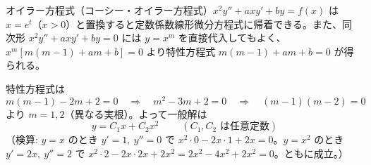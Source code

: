 
オイラー方程式（コーシー・オイラー方程式）$x^{2}y'' + axy' + by = f(x)$ は $x = e^{t}$（$x>0$）と置換すると定数係数線形微分方程式に帰着できる。また、同次形 $x^{2}y''+axy'+by=0$ には $y=x^{m}$ を直接代入してもよく、$x^{m}\left[m(m-1)+am+b\right]=0$ より特性方程式 $m(m-1)+am+b=0$ が得られる。

特性方程式は
\[
m(m-1) - 2m + 2 = 0
\quad\Longrightarrow\quad
m^{2} - 3m + 2 = 0
\quad\Longrightarrow\quad
(m-1)(m-2) = 0
\]
より $m = 1, 2$（異なる実根）。よって一般解は
\[
\boxed{\; y = C_{1}x + C_{2}x^{2} \;}
\qquad (C_{1}, C_{2} \text{ は任意定数})
\]
（検算: $y=x$ のとき $y'=1,\ y''=0$ で $x^{2}\cdot 0 - 2x\cdot 1 + 2x = 0$。$y=x^{2}$ のとき $y'=2x,\ y''=2$ で $x^{2}\cdot 2 - 2x\cdot 2x + 2x^{2} = 2x^{2}-4x^{2}+2x^{2}=0$。ともに成立。）
